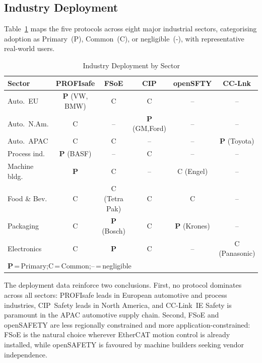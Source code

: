 \documentclass[conference]{IEEEtran}
\begin{document}
\subsection{Industry Deployment}

Table~\ref{tab:deploy} maps the five protocols across eight major
industrial sectors, categorising adoption as Primary~(P), Common~(C),
or negligible~(-), with representative real-world users.

\begin{table}[h]
\caption{Industry Deployment by Sector}
\label{tab:deploy}
\centering
\scriptsize
\setlength{\tabcolsep}{2.5pt}
\renewcommand{\arraystretch}{1.2}
\begin{tabular}{l|ccccc}
\toprule
\textbf{Sector} & \textbf{PROFIsafe} & \textbf{FSoE} & \textbf{CIP} &
\textbf{openSFTY} & \textbf{CC-Lnk} \\
\midrule
Auto.\ EU     & \textbf{P} (VW, BMW)   & C              & C              & --             & -- \\
Auto.\ N.Am.  & C                      & --             & \textbf{P} (GM,Ford) & --       & -- \\
Auto.\ APAC   & C                      & C              & --             & --             & \textbf{P} (Toyota) \\
Process ind.  & \textbf{P} (BASF)      & --             & C              & --             & -- \\
Machine bldg. & \textbf{P}             & C              & --             & C (Engel)      & -- \\
Food \& Bev.  & C                      & C (Tetra Pak)  & C              & C              & -- \\
Packaging     & C                      & \textbf{P} (Bosch) & C          & \textbf{P} (Krones) & -- \\
Electronics   & C                      & \textbf{P}     & C              & --             & C (Panasonic) \\
\bottomrule
\multicolumn{6}{l}{\textbf{P}\,=\,Primary;\quad C\,=\,Common;\quad --\,=\,negligible}
\end{tabular}
\end{table}

The deployment data reinforce two conclusions. First, no protocol dominates
across all sectors: PROFIsafe leads in European automotive and process
industries, CIP~Safety leads in North America, and CC-Link~IE Safety
is paramount in the APAC automotive supply chain. Second, FSoE and
openSAFETY are less regionally constrained and more application-constrained:
FSoE is the natural choice wherever EtherCAT motion control is already
installed, while openSAFETY is favoured by machine builders seeking
vendor independence.
\end{document}
